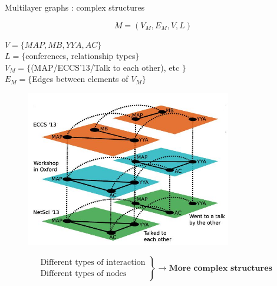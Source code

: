 \documentclass[15pt]{beamer}
\begin{document}
\begin{frame}{Multilayer graphs : complex structures}

\[
	M=(V_M,E_M,V,L)
\]
\begin{minipage}{0.4\textwidth}
\begin{footnotesize}
$V = \{MAP,MB,YYA,AC\}$\\
$L = \{$conferences, relationship types$\}$\\
$V_M = \{$(MAP/ECCS'13/Talk to each other), etc $\}$\\
$E_M = \{$Edges between elements of $V_M \}$
\end{footnotesize}
\end{minipage}
\begin{minipage}[r]{0.59\textwidth}
\begin{figure}
    \flushright
    \includegraphics[width=0.8\textwidth]{img/exMulti.jpg}
\end{figure}
\end{minipage}
$$
\left.
\begin{array}{l}
    \text{ Different types of interaction}\\
    \text{ Different types of nodes}
\end{array}
\right \}\rightarrow \textbf{More complex structures}
$$

\end{frame}
\end{document}
